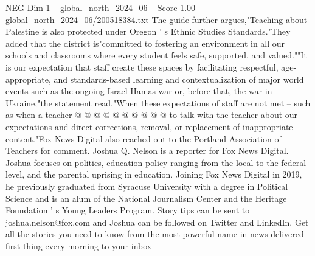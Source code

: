 \begin{textsample}{NEG Dim 1 – global\_north\_2024\_06 – Score 1.00 – global\_north\_2024\_06/200518384.txt}
The guide further argues,"Teaching about Palestine is also protected under Oregon ' s Ethnic Studies Standards."They added that the district is"committed to fostering an environment in all our schools and classrooms where every student feels safe, supported, and valued.""It is our expectation that staff create these spaces by facilitating respectful, age-appropriate, and standards-based learning and contextualization of major world events such as the ongoing Israel-Hamas war or, before that, the war in Ukraine,"the statement read."When these expectations of staff are not met -- such as when a teacher @ @ @ @ @ @ @ @ @ @ to talk with the teacher about our expectations and direct corrections, removal, or replacement of inappropriate content."Fox News Digital also reached out to the Portland Association of Teachers for comment.
Joshua Q.
Nelson is a reporter for Fox News Digital.
Joshua focuses on politics, education policy ranging from the local to the federal level, and the parental uprising in education.
Joining Fox News Digital in 2019, he previously graduated from Syracuse University with a degree in Political Science and is an alum of the National Journalism Center and the Heritage Foundation ' s Young Leaders Program.
Story tips can be sent to joshua.nelson@fox.com and Joshua can be followed on Twitter and LinkedIn.
Get all the stories you need-to-know from the most powerful name in news delivered first thing every morning to your inbox

\end{textsample}
